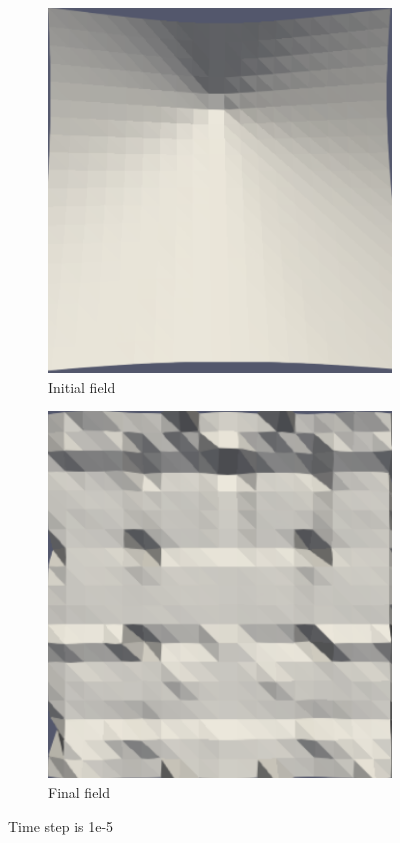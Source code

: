 \documentclass{article}
\begin{document}
\begin{figure}[hbt!]
  \begin{subfigure}{0.5\textwidth}
        \centering
        \includegraphics[width=\textwidth]{Figures/e-5 20x20/for n 1.png}
        \caption{Initial field}
  \end{subfigure}
  \hfill
  \begin{subfigure}{0.4\textwidth}
        \centering
        \includegraphics[width=\textwidth]{Figures/e-5 20x20/for n 100.png}
        \caption{Final field}
  \end{subfigure}
  \caption{Time step is 1e-5}
  \label{t3m1_1} 
\end{figure}
\end{document}
